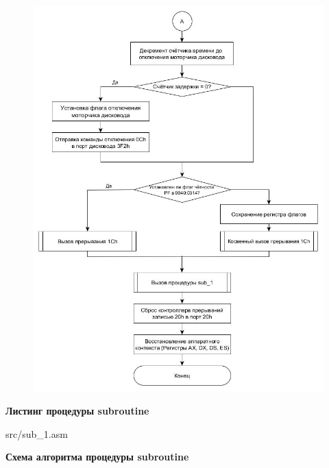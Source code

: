 \begin{figure}[!ht]
	\begin{center}
		\includegraphics[width=16cm]{img/int8h1.jpg}
	\end{center}
\end{figure}

\clearpage
\newpage

\begin{center}
	{\bf\normalsize Листинг процедуры subroutine}
\end{center}

\begin{lstinputlisting}[style={asm},linerange={1-95}]{src/sub\_1.asm}
\end{lstinputlisting}

\newpage
\begin{center}
	{\bf\normalsize Схема алгоритма процедуры subroutine}
\end{center}

